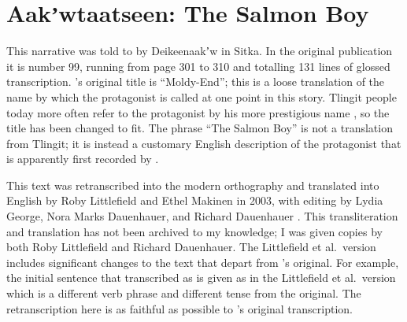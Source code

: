 
\resetexcnt
\chapter{Aakʼwtaatseen: The Salmon Boy}\label{ch:099-salmon-boy-sitka}

This narrative was told to \citeauthor{swanton:1909} by Deikeenaakʼw in Sitka.
In the original publication it is number 99, running from page 301 to 310 and totalling 131 lines of glossed transcription.
\citeauthor{swanton:1909}’s original title is “Moldy-End”; this is a loose translation of the name  by which the protagonist is called at one point in this story.
Tlingit people today more often refer to the protagonist by his more prestigious name , so the title has been changed to fit.
The phrase “The Salmon Boy” is not a translation from Tlingit; it is instead a customary English description of the protagonist that is apparently first recorded by \textcite{de-laguna:1972}.

This text was retranscribed into the modern orthography and translated into English by  Roby Littlefield and  Ethel Makinen in 2003, with editing by  Lydia George,  Nora Marks Dauenhauer, and  Richard Dauenhauer  \parencite{littlefield-makinen:2003}.
This transliteration and translation has not been archived to my knowledge; I was given copies by both Roby Littlefield and Richard Dauenhauer.
The Littlefield et al.\ version includes significant changes to the text that depart from \citeauthor{swanton:1909}’s original.
For example, the initial sentence that \citeauthor{swanton:1909} transcribed as  is given as  in the Littlefield et al.\ version which is a different verb phrase and different tense from the original.
The retranscription here is as faithful as possible to \citeauthor{swanton:1909}’s original transcription.

